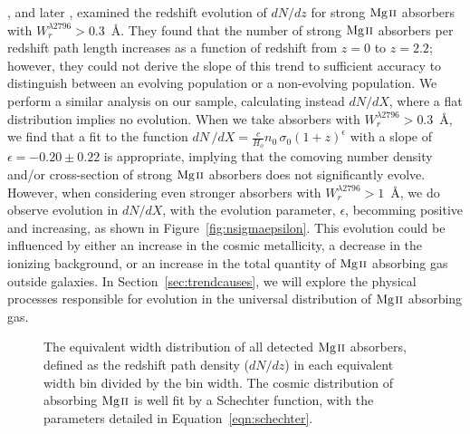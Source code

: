 \documentclass[iop,apj,numberedappendix,appendixfloats,twocolappendix]{emulateapj}
\begin{document}
\cite{Steidel1992}, and later \cite{Nestor2005}, examined the redshift evolution of $dN\!/dz$ for strong ${\hbox{{\rm Mg}\kern 0.1em{\sc ii}}}$ absorbers with $W_r^{\lambda2796} > 0.3$~{\AA}. They found that the number of strong ${\hbox{{\rm Mg}\kern 0.1em{\sc ii}}}$ absorbers per redshift path length increases as a function of redshift from $z = 0$ to $z = 2.2$; however, they could not derive the slope of this trend to sufficient accuracy to distinguish between an evolving population or a non-evolving population. We perform a similar analysis on our sample, calculating instead $dN\!/dX$, where a flat distribution implies no evolution. When we take absorbers with $W_r^{\lambda2796} > 0.3$~{\AA}, we find that a fit to the function $dN\,/dX = \frac{c}{H_o}n_0\,\sigma_0(1+z)^{\epsilon}$ with a slope of $\epsilon = -0.20 \pm 0.22$ is appropriate, implying that the comoving number density and/or cross-section of strong ${\hbox{{\rm Mg}\kern 0.1em{\sc ii}}}$ absorbers does not significantly evolve. However, when considering even stronger absorbers with $W_r^{\lambda2796} > 1$~{\AA}, we do observe evolution in $dN\!/dX$, with the evolution parameter, $\epsilon$, becomming positive and increasing, as shown in Figure~\ref{fig:nsigmaepsilon}. This evolution could be influenced by either an increase in the cosmic metallicity, a decrease in the ionizing background, or an increase in the total quantity of ${\hbox{{\rm Mg}\kern 0.1em{\sc ii}}}$ absorbing gas outside galaxies. In Section~\ref{sec:trendcauses}, we will explore the physical processes responsible for evolution in the universal distribution of ${\hbox{{\rm Mg}\kern 0.1em{\sc ii}}}$ absorbing gas.

\begin{figure}[bth]
\caption{The equivalent width distribution of all detected ${\hbox{{\rm Mg}\kern 0.1em{\sc ii}}}$ absorbers, defined as the redshift path density ($dN\!/dz$) in each equivalent width bin divided by the bin width. The cosmic distribution of absorbing ${\hbox{{\rm Mg}\kern 0.1em{\sc ii}}}$ is well fit by a Schechter function, with the parameters detailed in Equation~\ref{eqn:schechter}.}
\label{fig:totalewdistro}
\end{figure}
\end{document}
